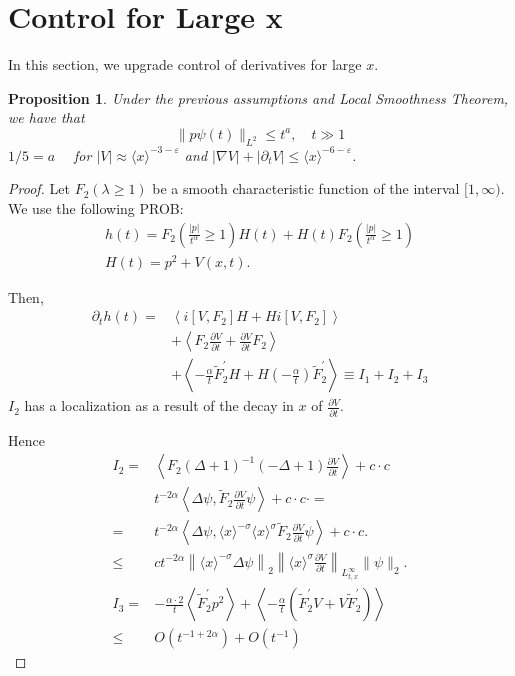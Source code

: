 \documentclass[11pt]{article}
\newtheorem{proposition}[theorem]{Proposition}
\begin{document}
\section{Control for Large x}

In this section, we upgrade control of derivatives for large $x$.

\begin{proposition}

Under the previous assumptions and Local Smoothness Theorem, we have that
$$
\|p \psi(t)\|_{L^{2}} \leqslant t^{a}, \quad t \gg 1
$$
$1 / 5=a \quad$ for $|V| \approx\langle x\rangle^{-3-\varepsilon}$ and $|\nabla V|+\left|\partial_{t} V\right| \leqslant\langle x\rangle^{-6-\varepsilon}$.
\end{proposition}
\begin{proof}
Let $F_2(\lambda \geq 1)$ be a smooth characteristic function of the interval $[1,\infty).$
We use the following PROB:
$$
\begin{gathered}
h(t)=F_{2}\left(\frac{|p|}{t^{\alpha}} \geqslant 1\right) H(t)+H(t) F_{2}\left(\frac{|p|}{t^{\alpha}} \geqslant 1\right) \\
H(t)=p^{2}+V(x, t) .
\end{gathered}
$$

Then,
$$
\begin{aligned}
\partial_{t} h(t)= & \left\langle i\left[V, F_{2}\right] H+H i\left[V, F_{2}\right]\right\rangle \\
& +\left\langle F_{2} \frac{\partial V}{\partial t}+\frac{\partial V}{\partial t} F_{2}\right\rangle \\
& +\left\langle-\frac{\alpha}{t} \tilde{F}_{2}^{\prime} H+H\left(-\frac{\alpha}{t}\right) \tilde{F}_{2}^{\prime}\right\rangle \equiv I_{1}+I_{2}+I_{3}
\end{aligned}
$$
$I_{2}$ has a localization as a result of the decay in $x$ of $\frac{\partial V}{\partial t}$.

Hence
$$
\begin{aligned}
I_{2}= & \left\langle F_{2}(\Delta+1)^{-1}(-\Delta+1){\frac{\partial V}{\partial t}}\right\rangle+c \cdot c \\
& t^{-2 \alpha}\left\langle\Delta \psi, \tilde{F}_{2} \frac{\partial V}{\partial t}\psi\right\rangle+c \cdot c \cdot= \\
= & t^{-2 \alpha}\left\langle\Delta \psi,\langle x\rangle^{-\sigma}\langle x\rangle^{\sigma} \tilde{F}_{2} \frac{\partial V}{\partial t} \psi\right\rangle+c \cdot c . \\
\leq & c t^{-2 \alpha}\left\|\langle x\rangle^{-\sigma} \Delta \psi\right\|_{2}\left\|\langle x\rangle^{\sigma} \frac{\partial V}{\partial t}\right\|_{L_{t, x}^{\infty}}\|\psi\|_{2}. \\
I_{3}= & -\frac{\alpha \cdot 2}{t}\left\langle\tilde{F}_{2}^{\prime} p^{2}\right\rangle+\left\langle-\frac{\alpha}{t}\left(\tilde{F}_{2}^{\prime} V+V \tilde{F}_{2}^{\prime}\right)\right\rangle \\
\leq & O\left(t^{-1+2 \alpha}\right)+O(t^{-1})
\end{aligned}
$$


\end{proof}
\end{document}
